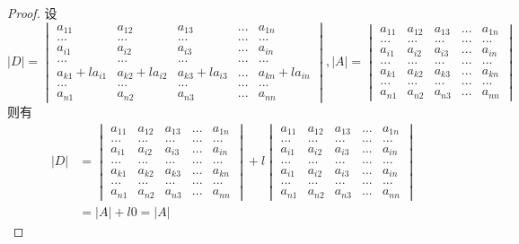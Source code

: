 \documentclass[blue,normal,cn]{elegantnote}
\begin{document}
\begin{proof}
    设
    $$
        |D|=
        \begin{vmatrix} 
            a_{11}&a_{12} & a_{13} &...& a_{1n}\\
            ...&...&...&...&...\\
            a_{i1}&a_{i2} & a_{i3} &...& a_{in}\\
            ...&...&...&...&...\\
            a_{k1}+la_{i1} & a_{k2}+la_{i2} & a_{k3}+la_{i3} &...& a_{kn}+la_{in}\\
            ...&...&...&...&...\\
            a_{n1}&a_{n2} & a_{n3} &...& a_{nn}
            \end{vmatrix}
        ,|A|=
            \begin{vmatrix} 
                a_{11}&a_{12} & a_{13} &...& a_{1n}\\
                ...&...&...&...&...\\
                a_{i1}&a_{i2} & a_{i3} &...& a_{in}\\
                ...&...&...&...&...\\
                a_{k1}&a_{k2} & a_{k3} &...& a_{kn}\\
                ...&...&...&...&...\\
                a_{n1}&a_{n2} & a_{n3} &...& a_{nn}
                \end{vmatrix}
        $$
则有
    $$
        \begin{aligned}
        |D|&=
            \begin{vmatrix} 
                a_{11}&a_{12} & a_{13} &...& a_{1n}\\
                ...&...&...&...&...\\
                a_{i1}&a_{i2} & a_{i3} &...& a_{in}\\
                ...&...&...&...&...\\
                a_{k1} & a_{k2} & a_{k3} &...& a_{kn}\\
                ...&...&...&...&...\\
                a_{n1}&a_{n2} & a_{n3} &...& a_{nn}
            \end{vmatrix}
        +l
            \begin{vmatrix} 
                a_{11}&a_{12} & a_{13} &...& a_{1n}\\
                ...&...&...&...&...\\
                a_{i1}&a_{i2} & a_{i3} &...& a_{in}\\
                ...&...&...&...&...\\
                a_{i1}&a_{i2} & a_{i3} &...& a_{in}\\
                ...&...&...&...&...\\
                a_{n1}&a_{n2} & a_{n3} &...& a_{nn}
                \end{vmatrix}
                \\
        &=|A|+l0=|A|
        \end{aligned}
        $$
\end{proof}
\end{document}
